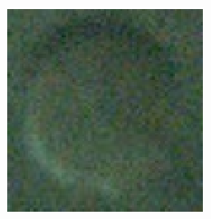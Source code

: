 \documentclass {udthesis}
\begin{document}
\begin{figure}
  \vskip 10pt
  \begin{minipage}[c]{\textwidth}
  \centering
    \begin{subfigure}[]{0.235\textwidth}
	\includegraphics[width=\textwidth]{our_crop_resize}

\end{subfigure}
\end{minipage}
\end{figure}
\end{document}
